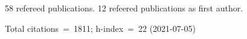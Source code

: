 58 refereed publications. 12 refeered publications as first author.

Total citations~=~1811; h-index~=~22 (2021-07-05)